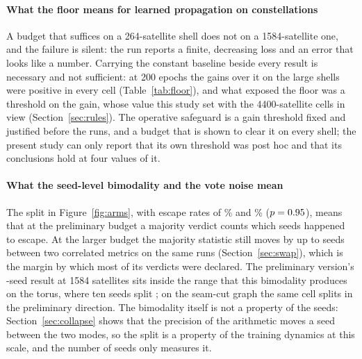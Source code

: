\documentclass[preprint,11pt,3p]{elsarticle}
\begin{document}
\paragraph{What the floor means for learned propagation on constellations}
A budget that suffices on a 264-satellite shell does not on a 1584-satellite one, and the failure
is silent: the run reports a finite, decreasing loss and an error that looks like a number.
Carrying the constant baseline beside every result is necessary and not sufficient: at 200
epochs the gains over it on the large shells were positive in every cell
(Table~\ref{tab:floor}), and what exposed the floor was a threshold on the gain, whose value this
study set with the 4400-satellite cells in view (Section~\ref{sec:rules}). The operative safeguard
is a gain threshold fixed and justified before the runs, and a budget that is shown to clear it
on every shell; the present study can only report that its own threshold was post hoc and that
its conclusions hold at four values of it.

\paragraph{What the seed-level bimodality and the vote noise mean}
The split in Figure~\ref{fig:arms}, with escape rates of \numEscapeHeatPct\% and
\numEscapeWalkPct\% ($p=0.95$), means that at the preliminary budget a majority verdict
counts which seeds happened to escape. At the larger budget the majority statistic still moves by
up to \numSwapMaxMoved{} seeds between two correlated metrics on the same runs
(Section~\ref{sec:swap}), which is the margin by which most of its verdicts were declared. The
preliminary version's \numPrelimSeeds{}-seed result at 1584 satellites sits inside the range that
this bimodality produces on the torus, where ten seeds split \numPooledHopsShellOneWins{}; on
the seam-cut graph the same cell splits \numSeamPooledHopsShellOneWins{} in the preliminary
direction. The bimodality itself is not a property of the seeds: Section~\ref{sec:collapse}
shows that the precision of the arithmetic moves a seed between the two modes, so the split is
a property of the training dynamics at this scale, and the number of seeds only measures it.
\end{document}
